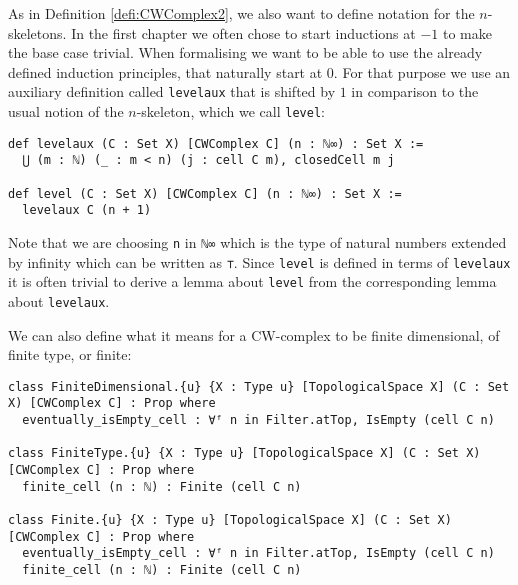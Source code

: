 As in Definition \ref{defi:CWComplex2}, we also want to define notation for the $n$-skeletons.
In the first chapter we often chose to start inductions at $-1$ to make the base case trivial.
When formalising we want to be able to use the already defined induction principles, that naturally start at $0$.
For that purpose we use an auxiliary definition called \lstinline{levelaux} that is shifted by $1$ in comparison to the usual notion of the $n$-skeleton, which we call \lstinline{level}: 
\href{https://github.com/scholzhannah/CWComplexes/blob/7be4872a05b534011cc969eb5b80a4b7f0bf57e2/CWcomplexes/Definition.lean#L137-L146}{\faExternalLink}

\begin{lstlisting}
def levelaux (C : Set X) [CWComplex C] (n : ℕ∞) : Set X :=
  ⋃ (m : ℕ) (_ : m < n) (j : cell C m), closedCell m j

def level (C : Set X) [CWComplex C] (n : ℕ∞) : Set X :=
  levelaux C (n + 1)
\end{lstlisting}

Note that we are choosing \lstinline{n} in \lstinline{ℕ∞} \href{https://github.com/leanprover-community/mathlib4/blob/ed125a4216d18273cb1b96d4c846d32b85d74faf/Mathlib/Data/ENat/Basic.lean#L27-L35}{\faExternalLink} which is the type of natural numbers extended by infinity which can be written as \lstinline{⊤}.
Since \lstinline{level} is defined in terms of \lstinline{levelaux} it is often trivial to derive a lemma about \lstinline{level} from the corresponding lemma about \lstinline{levelaux}.

We can also define what it means for a CW-complex to be finite dimensional, of finite type, or finite:
\href{https://github.com/scholzhannah/CWComplexes/blob/7be4872a05b534011cc969eb5b80a4b7f0bf57e2/CWcomplexes/Finite.lean#L28-L43}{\faExternalLink}

\begin{lstlisting}
class FiniteDimensional.{u} {X : Type u} [TopologicalSpace X] (C : Set X) [CWComplex C] : Prop where
  eventually_isEmpty_cell : ∀ᶠ n in Filter.atTop, IsEmpty (cell C n)

class FiniteType.{u} {X : Type u} [TopologicalSpace X] (C : Set X) [CWComplex C] : Prop where
  finite_cell (n : ℕ) : Finite (cell C n)

class Finite.{u} {X : Type u} [TopologicalSpace X] (C : Set X) [CWComplex C] : Prop where
  eventually_isEmpty_cell : ∀ᶠ n in Filter.atTop, IsEmpty (cell C n)
  finite_cell (n : ℕ) : Finite (cell C n)
\end{lstlisting}

